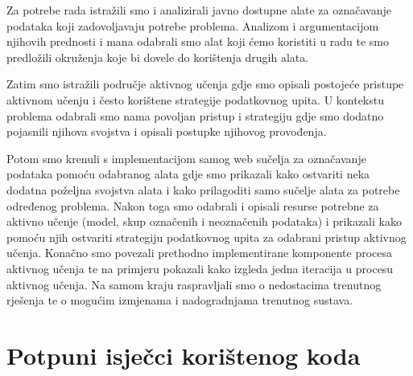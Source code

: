\documentclass[times, utf8, zavrsni, numeric]{fer}
\begin{document}
Za potrebe rada istražili smo i analizirali javno dostupne alate za označavanje podataka koji zadovoljavaju potrebe problema. Analizom i argumentacijom njihovih prednosti i mana odabrali smo alat koji ćemo koristiti u radu te smo predložili okruženja koje bi dovele do korištenja drugih alata. 

Zatim smo istražili područje aktivnog učenja gdje smo opisali postojeće pristupe aktivnom učenju i često korištene strategije podatkovnog upita. U kontekstu problema odabrali smo nama povoljan pristup i strategiju gdje smo dodatno pojasnili njihova svojstva i opisali postupke njihovog provođenja. 

Potom smo krenuli s implementacijom samog web sučelja za označavanje podataka pomoću odabranog alata gdje smo prikazali kako ostvariti neka dodatna poželjna svojstva alata i kako prilagoditi samo sučelje alata za potrebe određenog problema. Nakon toga smo odabrali i opisali resurse potrebne za aktivno učenje (model, skup označenih i neoznačenih podataka) i prikazali kako pomoću njih ostvariti strategiju podatkovnog upita za odabrani pristup aktivnog učenja. Konačno smo povezali prethodno implementirane komponente procesa aktivnog učenja te na primjeru pokazali kako izgleda jedna iteracija u procesu aktivnog učenja. Na samom kraju raspravljali smo o nedostacima trenutnog rješenja te o mogućim izmjenama i nadogradnjama trenutnog sustava.




\appendix
\chapter{Potpuni isječci korištenog koda}
\end{document}
